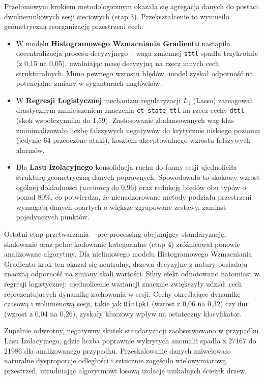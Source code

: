 \documentclass[12pt,twoside]{article}
\begin{document}
Przełomowym krokiem metodologicznym okazała się agregacja danych do postaci dwukierunkowych sesji sieciowych (etap 3). Przekształcenie to wymusiło geometryczną reorganizację przestrzeni cech:
\begin{itemize}
    \item W modelu \textbf{Histogramowego Wzmacniania Gradientu} nastąpiła decentralizacja procesu decyzyjnego – waga zmiennej \texttt{sttl} spadła trzykrotnie (z 0,15 na 0,05), uwalniając masę decyzyjną na rzecz innych cech strukturalnych. 
    Mimo pewnego wzrostu błędów, model zyskał odporność na potencjalne zmiany w syganturach nagłówków.
    \item W \textbf{Regresji Logistycznej} mechanizm regularyzacji $L_1$ (Lasso) zareagował drastycznym zmniejszeniem znaczenia \texttt{ct\_state\_ttl} na rzecz cechy \texttt{dttl} (skok współczynnika do 1,59). 
    Zastosowanie zbalansowanych wag klas zminimalizowało liczbę fałszywych negatywów do krytycznie niskiego poziomu (jedynie 64 przeoczone ataki), kosztem akceptowalnego wzrostu fałszywych alarmów.
    \item Dla \textbf{Lasu Izolacyjnego} konsolidacja ruchu do formy sesji ujednoliciła strukturę geometryczną danych poprawnych. 
    Spowodowało to skokowy wzrost ogólnej dokładności (\emph{accuracy} do 0,96) oraz redukcję błędów obu typów o ponad 80\%, co potwierdza, że nienadzorowane metody podziału przestrzeni wymagają danych opartych o większe zgrupowane zestawy, zamiast pojedynczych punktów.
\end{itemize}

Ostatni etap przetwarzania – pre-processing obejmujący standaryzację, skalowanie oraz pełne kodowanie kategorialne (etap 4) zróżnicował ponowie analizowane algorytmy. 
Dla nieliniowego modelu Histogramowego Wzmacniania Gradientu krok ten okazał się neutralny, drzewa decyzyjne z natury posiadają znaczną odporność na zmiany skali wartości.
Silny efekt odnotowano natomiast w regresji logistycznej: ujednolicenie wariancji znacznie zwiększyły udział cech reprezentujących dynamikę zachowania w sesji.
Cechy określające dynamikę czasową i wolumenową sesji, takie jak \texttt{Dintpkt} (wzrost z 0,06 na 0,32) czy \texttt{dur} (wzrost z 0,04 na 0,26), zyskały kluczowy wpływ na ostateczny klasyfikator. 

Zupełnie odwrotny, negatywny skutek standaryzacji zaobserwowano w przypadku Lasu Izolacyjnego, gdzie liczba poprawnie wykrytych anomalii spadła z 27167 do 21986 dla analizowanego przypadku. 
Przeskalowanie danych zniwelowało naturalne dysproporcje odległości i sztucznie zagęściło wielowymiarową przestrzeń, utrudniając algorytmowi losową izolację unikalnych ścieżek drzew.
\end{document}

